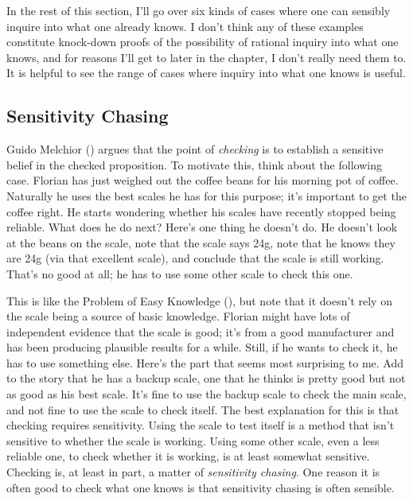 \documentclass[
  10pt,
  letterpaper,
  twoside]{scrbook}
\begin{document}
In the rest of this section, I'll go over six kinds of cases where one
can sensibly inquire into what one already knows. I don't think any of
these examples constitute knock-down proofs of the possibility of
rational inquiry into what one knows, and for reasons I'll get to later
in the chapter, I don't really need them to. It is helpful to see the
range of cases where inquiry into what one knows is useful.

\subsection{Sensitivity Chasing}\label{sec-sensitiveinquiry}

Guido Melchior () argues that the point
of \emph{checking} is to establish a sensitive belief in the checked
proposition. To motivate this, think about the following case. Florian
has just weighed out the coffee beans for his morning pot of coffee.
Naturally he uses the best scales he has for this purpose; it's
important to get the coffee right. He starts wondering whether his
scales have recently stopped being reliable. What does he do next?
Here's one thing he doesn't do. He doesn't look at the beans on the
scale, note that the scale says 24g, note that he knows they are 24g
(via that excellent scale), and conclude that the scale is still
working. That's no good at all; he has to use some other scale to check
this one.

This is like the Problem of Easy Knowledge
(), but note that it doesn't rely
on the scale being a source of basic knowledge. Florian might have lots
of independent evidence that the scale is good; it's from a good
manufacturer and has been producing plausible results for a while.
Still, if he wants to check it, he has to use something else. Here's the
part that seems most surprising to me. Add to the story that he has a
backup scale, one that he thinks is pretty good but not as good as his
best scale. It's fine to use the backup scale to check the main scale,
and not fine to use the scale to check itself. The best explanation for
this is that checking requires sensitivity. Using the scale to test
itself is a method that isn't sensitive to whether the scale is working.
Using some other scale, even a less reliable one, to check whether it is
working, is at least somewhat sensitive. Checking is, at least in part,
a matter of \emph{sensitivity chasing}. One reason it is often good to
check what one knows is that sensitivity chasing is often sensible.
\end{document}
